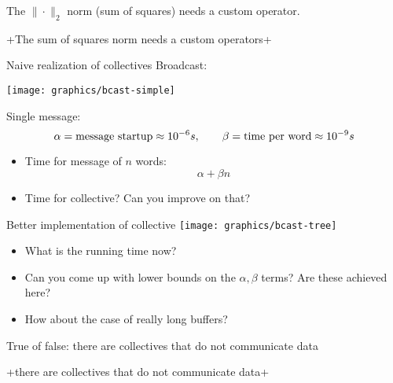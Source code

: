 \begin{reviewframe}
  The $\|\cdot\|_2$ norm (sum of squares) needs a custom operator.
  
  \slackpollTF+The sum of squares norm needs a custom operators+
\end{reviewframe}


\begin{numberedframe}{Naive realization of collectives}
  Broadcast:
  
  \texttt{[image: graphics/bcast-simple]}

  Single message:
  \[ \alpha=\hbox{message startup}\approx 10^{-6}s,\qquad
  \beta=\hbox{time per word}\approx 10^{-9}s
  \]
  \begin{itemize}
  \item<2->Time for message of $n$ words: \[ \alpha +\beta n \]
  \item<3->Time for collective? Can you improve on that?
  \end{itemize}

\end{numberedframe}

\begin{numberedframe}{Better implementation of collective}
  \texttt{[image: graphics/bcast-tree]}
  
  \begin{itemize}
  \item<1->
    What is the running time now?
  \item<2->
    Can you come up with lower bounds on the $\alpha,\beta$ terms? Are
    these achieved here?
  \item<3-> How about the case of really long buffers?
  \end{itemize}

\end{numberedframe}

\begin{reviewframe}
  True of false: there are collectives that do not communicate data

  \slackpollTF+there are collectives that do not communicate data+
\end{reviewframe}

\endinput

\begin{numberedframe}{}
\begin{lstlisting}
  
\end{lstlisting}
\end{numberedframe}

\begin{numberedframe}{}
\begin{lstlisting}
  
\end{lstlisting}
\end{numberedframe}

\begin{numberedframe}{}
\begin{verbatim}
  
\end{verbatim}
\end{numberedframe}

